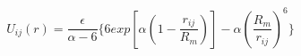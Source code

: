 \documentclass[12pt]{article}
\begin{document}
$$
U_{ij}(r) = \frac{\epsilon}{\alpha-6}\{6exp[\alpha(1-\frac{r_{ij}}{R_{m}})]-\alpha(\frac{R_{m}}{r_{ij}})^6\}
$$
\end{document}
